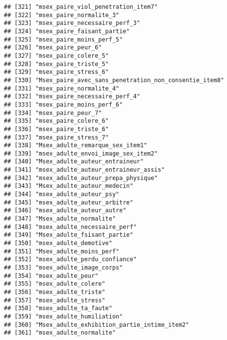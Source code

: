 \documentclass[
]{article}
\begin{document}
\begin{verbatim}
## [321] "msex_paire_viol_penetration_item7"                   
## [322] "msex_paire_normalite_3"                              
## [323] "msex_paire_necessaire_perf_3"                        
## [324] "msex_paire_faisant_partie"                           
## [325] "msex_paire_moins_perf_5"                             
## [326] "msex_paire_peur_6"                                   
## [327] "msex_paire_colere_5"                                 
## [328] "msex_paire_triste_5"                                 
## [329] "msex_paire_stress_6"                                 
## [330] "Msex_paire_avec_sans_penetration_non_consentie_item8"
## [331] "msex_paire_normalite_4"                              
## [332] "msex_paire_necessaire_perf_4"                        
## [333] "msex_paire_moins_perf_6"                             
## [334] "msex_paire_peur_7"                                   
## [335] "msex_paire_colere_6"                                 
## [336] "msex_paire_triste_6"                                 
## [337] "msex_paire_stress_7"                                 
## [338] "Msex_adulte_remarque_sex_item1"                      
## [339] "msex_adulte_envoi_image_sex_item2"                   
## [340] "Msex_adulte_auteur_entraineur"                       
## [341] "msex_adulte_auteur_entraineur_assis"                 
## [342] "msex_adulte_auteur_prepa_physique"                   
## [343] "Msex_adulte_auteur_medecin"                          
## [344] "msex_adulte_auteur_psy"                              
## [345] "msex_adulte_auteur_arbitre"                          
## [346] "msex_adulte_auteur_autre"                            
## [347] "Msex_adulte_normalite"                               
## [348] "msex_adulte_necessaire_perf"                         
## [349] "Msex_adulte_fsisant_partie"                          
## [350] "msex_adulte_demotive"                                
## [351] "Msex_adulte_moins_perf"                              
## [352] "msex_adulte_perdu_confiance"                         
## [353] "msex_adulte_image_corps"                             
## [354] "msex_adulte_peur"                                    
## [355] "msex_adulte_colere"                                  
## [356] "msex_adulte_triste"                                  
## [357] "msex_adulte_stress"                                  
## [358] "msex_adulte_ta_faute"                                
## [359] "msex_adulte_humiliation"                             
## [360] "Msex_adulte_exhibition_partie_intime_item2"          
## [361] "msex_adulte_normalite"                               

\end{verbatim}
\end{document}
